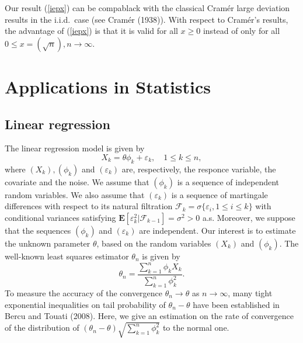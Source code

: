 \documentclass{gSTA2e}
\theoremstyle{plain}
\theoremstyle{definition}
\theoremstyle{remark}
\begin{document}
Our result (\ref{iepx})  can be compablack with the classical Cram\'{e}r  large deviation results in the i.i.d.\ case (see Cram\'{e}r (1938)). With respect to Cram\'{e}r's results, the advantage of (\ref{iepx}) is that it is valid for all $x\geq0$ instead of only for all $0\leq x =(\sqrt{n}), n\rightarrow \infty.$





\section{Applications in Statistics}\label{sec3}

\subsection{Linear regression}
The linear regression model is given by
\begin{equation}\label{ine29}
X_{k}=\theta \phi_k + \varepsilon_{k}, \quad  1 \leq k \leq n,
\end{equation}
where $(X_k), (\phi_k)$ and $(\varepsilon_{k})$ are, respectively,  the responce variable, the covariate and the noise. We assume that $(\phi_k)$ is a sequence of independent  random variables. We also assume that $(\varepsilon_k)$ is a sequence of martingale differences with respect to its natural filtration $\mathcal{F}_k=\sigma\{\varepsilon_i, 1\leq i  \leq k \}$  with conditional variances satisfying $\mathbf{E}[\varepsilon_k^2| \mathcal{F}_{k-1}]=\sigma^2>0 $ a.s.   Moreover, we suppose that the sequences $(\phi_k)$ and  $(\varepsilon_k)$ are independent. Our interest is to estimate the unknown parameter $\theta$, based on the random variables $(X_k)$ and $(\phi_k)$.   The well-known least squares estimator $\theta_n$ is given by
\begin{equation}\label{ine30}
\theta_n = \frac{\sum_{k=1}^n \phi_{k} X_k}{\sum_{k=1}^n \phi_{k}^2}.
\end{equation}
To measure the accuracy of the convergence $\theta_n \to \theta$ as $n\rightarrow \infty$, many tight exponential inequalities on tail probability of $\theta_n -\theta$ have been established in Bercu and Touati (2008).
Here, we give an  estimation on the rate of convergence of the distribution of
$(\theta_n -\theta)\sqrt{\sum_{k=1}^n \phi_{k}^2}$ to the normal one.
\end{document}
